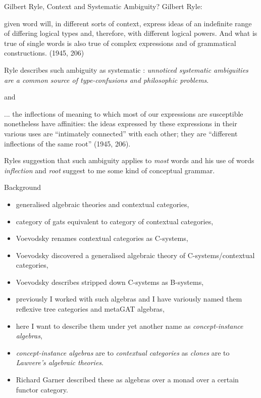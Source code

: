 
\begin{frame}{Gilbert Ryle, Context and Systematic Ambiguity?}
Gilbert Ryle:
\begin{tightquote}
[a] given word will, in different sorts of context, express ideas of an indefinite range of differing logical types and, therefore, with different logical powers. And what is true of single words is also true of complex expressions and of grammatical constructions. (1945, 206)
\end{tightquote}
\medskip
Ryle describes such ambiguity as systematic : \textit{unnoticed systematic ambiguities are a common source of type-confusions and philosophic problems}.
\end{frame}
\begin{frame}
and
\begin{tightquote}
... the inflections of meaning to which most of our expressions are susceptible nonetheless have affinities: the ideas expressed by these expressions in their various uses are “intimately connected” with each other; they are “different inflections of the same root” (1945, 206).
\end{tightquote}
\medskip
Ryles suggestion that such ambiguity applies to \textit{most} words and his use of words \textit{inflection} and \textit{root} suggest to me some kind of conceptual grammar. 
\end{frame}

\begin{frame}{Background}
\begin{itemize}
\item generalised algebraic theories and contextual categories,
\item category of gats equivalent to category of contextual categories,
\item Voevodsky renames contextual categories as C-systems,
\item Voevodsky discovered a generalised algebraic theory of C-systems/contextual categories,
\item Voevodsky describes stripped down  C-systems as B-systems,
\item previously I worked with such algebras and I have variously named them reflexive tree categories and metaGAT algebras,
\item here I want to describe them under yet another name as \textit{concept-instance algebras},
\item \textit{concept-instance algebras} are to \textit{contextual categories} as \textit{clones} are to \textit{Lawvere's  algebraic theories}.
\item Richard Garner described these as algebras over a monad over a certain functor category.
\end{itemize}
\end{frame}

